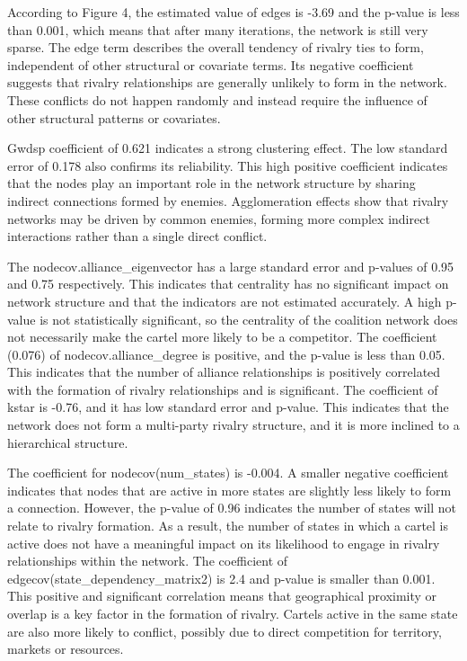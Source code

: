 \documentclass[
]{article}
\begin{document}
According to Figure 4, the estimated value of edges is -3.69 and the
p-value is less than 0.001, which means that after many iterations, the
network is still very sparse. The edge term describes the overall
tendency of rivalry ties to form, independent of other structural or
covariate terms. Its negative coefficient suggests that rivalry
relationships are generally unlikely to form in the network. These
conflicts do not happen randomly and instead require the influence of
other structural patterns or covariates.

Gwdsp coefficient of 0.621 indicates a strong clustering effect. The low
standard error of 0.178 also confirms its reliability. This high
positive coefficient indicates that the nodes play an important role in
the network structure by sharing indirect connections formed by enemies.
Agglomeration effects show that rivalry networks may be driven by common
enemies, forming more complex indirect interactions rather than a single
direct conflict.

The nodecov.alliance\_eigenvector has a large standard error and
p-values of 0.95 and 0.75 respectively. This indicates that centrality
has no significant impact on network structure and that the indicators
are not estimated accurately. A high p-value is not statistically
significant, so the centrality of the coalition network does not
necessarily make the cartel more likely to be a competitor. The
coefficient (0.076) of nodecov.alliance\_degree is positive, and the
p-value is less than 0.05. This indicates that the number of alliance
relationships is positively correlated with the formation of rivalry
relationships and is significant. The coefficient of kstar is -0.76, and
it has low standard error and p-value. This indicates that the network
does not form a multi-party rivalry structure, and it is more inclined
to a hierarchical structure.

The coefficient for nodecov(num\_states) is -0.004. A smaller negative
coefficient indicates that nodes that are active in more states are
slightly less likely to form a connection. However, the p-value of 0.96
indicates the number of states will not relate to rivalry formation. As
a result, the number of states in which a cartel is active does not have
a meaningful impact on its likelihood to engage in rivalry relationships
within the network. The coefficient of
edgecov(state\_dependency\_matrix2) is 2.4 and p-value is smaller than
0.001. This positive and significant correlation means that geographical
proximity or overlap is a key factor in the formation of rivalry.
Cartels active in the same state are also more likely to conflict,
possibly due to direct competition for territory, markets or resources.
\end{document}
